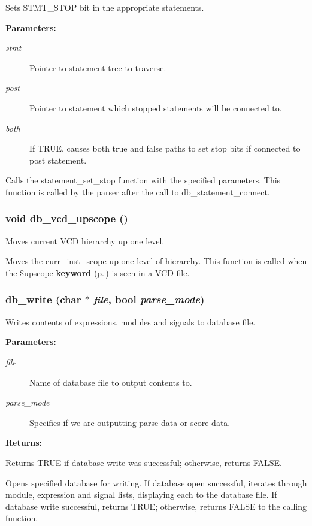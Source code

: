 Sets STMT\_\-STOP bit in the appropriate statements.

\begin{Desc}
\item[{\bf Parameters: }]\par
\begin{description}
\item[
{\em stmt}]Pointer to statement tree to traverse. \item[
{\em post}]Pointer to statement which stopped statements will be connected to. \item[
{\em both}]If TRUE, causes both true and false paths to set stop bits if connected to post statement.

\end{description}
\end{Desc}
Calls the statement\_\-set\_\-stop function with the specified parameters. This function is called by the parser after the call to db\_\-statement\_\-connect. 
\subsubsection{\setlength{\rightskip}{0pt plus 5cm}void db\_\-vcd\_\-upscope ()}\label{db_8h_a21}


Moves current VCD hierarchy up one level.

Moves the curr\_\-inst\_\-scope up one level of hierarchy. This function is called when the \$upscope {\bf keyword} {\rm (p.\,\pageref{structkeyword})} is seen in a VCD file. 
\subsubsection{ db\_\-write (char $\ast$ {\em file}, {\bf bool} {\em parse\_\-mode})}\label{db_8h_a0}


Writes contents of expressions, modules and signals to database file.

\begin{Desc}
\item[{\bf Parameters: }]\par
\begin{description}
\item[
{\em file}]Name of database file to output contents to. \item[
{\em parse\_\-mode}]Specifies if we are outputting parse data or score data.

\end{description}
\end{Desc}
\begin{Desc}
\item[{\bf Returns: }]\par
Returns TRUE if database write was successful; otherwise, returns FALSE.

\end{Desc}
Opens specified database for writing. If database open successful, iterates through module, expression and signal lists, displaying each to the database file. If database write successful, returns TRUE; otherwise, returns FALSE to the calling function. 